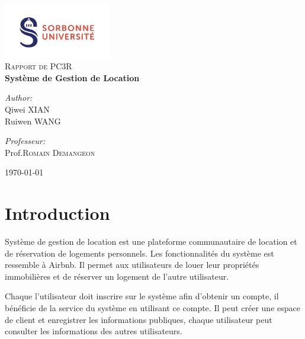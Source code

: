 \documentclass[14px]{article}
\begin{document}
\setlength{\parindent}{0pt}
\begin{titlepage}
	\begin{center}
		\includegraphics[width=0.35\textwidth]{logo.png}\\[1cm]
		\textsc{\Large Rapport de PC3R}\\[0.5cm]
		{ \huge \bfseries Système de Gestion de Location}\\[0.4cm]
		\begin{minipage}{0.4\textwidth}
			\begin{flushleft} \large
				\emph{Author:}\\
				Qiwei \textsc{XIAN}\\
				Ruiwen \textsc{WANG}\\
			\end{flushleft}
		\end{minipage}
		\begin{minipage}{0.4\textwidth}
				\begin{flushright} \large
				\emph{Professeur:} \\
				Prof.\textsc{Romain Demangeon}
			\end{flushright}
		\end{minipage}
		\vfill
		{\large \today}
	\end{center}
\end{titlepage}
\clearpage

\tableofcontents
\thispagestyle{empty}
\clearpage
\section{Introduction}
Système de gestion de location est une plateforme communautaire de location et de réservation de logements personnels. Les fonctionnalités du système est ressemble à Airbnb. Il permet aux utilisateurs de louer leur propriétés immobilières et de réserver un logement de l'autre utilisateur.

Chaque l'utilisateur doit inscrire sur le système afin d'obtenir un compte, il bénéficie de la service du système en utilisant ce compte. Il peut créer une espace de client et enregistrer les informations publiques, chaque utilisateur peut consulter les informations des autres utilisateurs.
\end{document}
